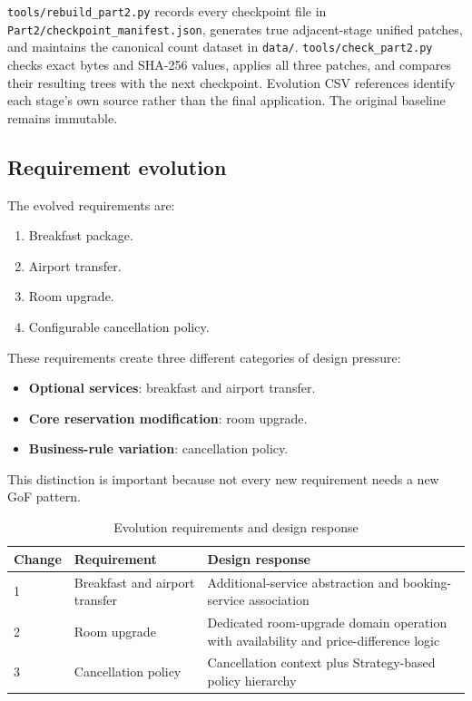 \documentclass[10pt,a4paper]{article}
\newcommand{\code}[1]{\texttt{\small #1}}
\begin{document}
\code{tools/rebuild\_part2.py} records every checkpoint file in \code{Part2/checkpoint\_manifest.json}, generates true adjacent-stage unified patches, and maintains the canonical count dataset in \code{data/}. \code{tools/check\_part2.py} checks exact bytes and SHA-256 values, applies all three patches, and compares their resulting trees with the next checkpoint. Evolution CSV references identify each stage's own source rather than the final application. The original baseline remains immutable.

\subsection{Requirement evolution}

The evolved requirements are:

\begin{enumerate}[leftmargin=*]
\item Breakfast package.
\item Airport transfer.
\item Room upgrade.
\item Configurable cancellation policy.
\end{enumerate}

These requirements create three different categories of design pressure:

\begin{itemize}[leftmargin=*]
\item \textbf{Optional services}: breakfast and airport transfer.
\item \textbf{Core reservation modification}: room upgrade.
\item \textbf{Business-rule variation}: cancellation policy.
\end{itemize}

This distinction is important because not every new requirement needs a new GoF pattern.

\begin{table}[H]
\centering
\caption{Evolution requirements and design response}
\label{tab:changes}
\begin{tabularx}{\linewidth}{lXX}
\toprule
Change & Requirement & Design response\\
\midrule
1 & Breakfast and airport transfer & Additional-service abstraction and booking-service association\\
2 & Room upgrade & Dedicated room-upgrade domain operation with availability and price-difference logic\\
3 & Cancellation policy & Cancellation context plus Strategy-based policy hierarchy\\
\bottomrule
\end{tabularx}
\end{table}
\end{document}

